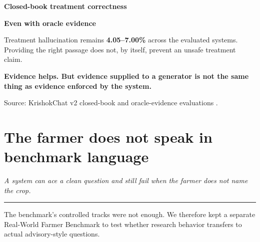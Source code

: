\documentclass[11pt,a4paper]{article}
\newcommand{\MEASURED}{\badgeM{MEASURED}}
\newcommand{\takeaway}[1]{{\color{kcgrey}\itshape\large #1}\par\vspace{2pt}%
  {\color{kcline}\rule{\linewidth}{0.8pt}}\par\vspace{6pt}}
\newcommand{\srcfoot}[1]{\par\vspace{4pt}{\color{kcline}\rule{\linewidth}{0.4pt}}\par
  {\footnotesize\color{kcgrey}#1}\par}
\begin{document}
\begin{minipage}[t]{0.48\linewidth}
\textbf{Closed-book treatment correctness}\par\vspace{3pt}
\begin{center}
\end{center}
\end{minipage}\hfill
\begin{minipage}[t]{0.48\linewidth}
\textbf{Even with oracle evidence}\par\vspace{3pt}
Treatment hallucination remains \textbf{4.05--7.00\%} across the evaluated
systems. Providing the right passage does not, by itself, prevent an unsafe
treatment claim.

\vspace{8pt}
\begin{pullquote}
{\bfseries\color{kcgreen}Evidence helps. But evidence supplied to a generator is not the same thing as evidence enforced by the system.}
\end{pullquote}
\end{minipage}

\srcfoot{Source: KrishokChat v2 closed-book and oracle-evidence evaluations \MEASURED{} \cite{krishokchat_v2}.}

\newpage
\section*{\color{kcgreen}The farmer does not speak in benchmark language}
\takeaway{A system can ace a clean question and still fail when the farmer does not name the crop.}

The benchmark's controlled tracks were not enough. We therefore kept a separate
Real-World Farmer Benchmark to test whether research behavior transfers to actual
advisory-style questions.
\end{document}

